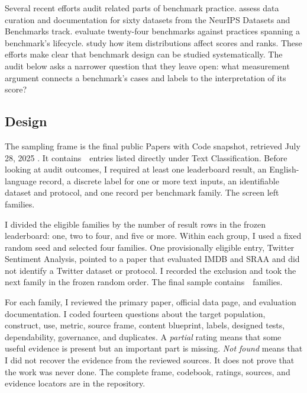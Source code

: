 \documentclass[11pt]{article}
\begin{document}
Several recent efforts audit related parts of benchmark practice. {\citet{bhardwaj2024curation}} assess data curation and documentation for sixty datasets from the NeurIPS Datasets and Benchmarks track. {\citet{reuel2024betterbench}} evaluate twenty-four benchmarks against practices spanning a benchmark's lifecycle. {\citet{kovatchev2024transparency}} study how item distributions affect scores and ranks. These efforts make clear that benchmark design can be studied systematically. The audit below asks a narrower question that they leave open: what measurement argument connects a benchmark's cases and labels to the interpretation of its score?

\subsection*{Design}

The sampling frame is the final public Papers with Code snapshot, retrieved July 28, 2025 \citep{pwcArchive2025}. It contains \,\AuditFrameCount\, entries listed directly under Text Classification. Before looking at audit outcomes, I required at least one leaderboard result, an English-language record, a discrete label for one or more text inputs, an identifiable dataset and protocol, and one record per benchmark family. The screen left \,\AuditEligibleCount\, families.

I divided the eligible families by the number of result rows in the frozen leaderboard: one, two to four, and five or more. Within each group, I used a fixed random seed and selected four families. One provisionally eligible entry, Twitter Sentiment Analysis, pointed to a paper that evaluated IMDB and SRAA and did not identify a Twitter dataset or protocol. I recorded the exclusion and took the next family in the frozen random order. The final sample contains \,\AuditSampleCount\, families.

For each family, I reviewed the primary paper, official data page, and evaluation documentation. I coded fourteen questions about the target population, construct, use, metric, source frame, content blueprint, labels, designed tests, dependability, governance, and duplicates. A {\emph{partial}} rating means that some useful evidence is present but an important part is missing. {\emph{Not found}} means that I did not recover the evidence from the reviewed sources. It does not prove that the work was never done. The complete frame, codebook, ratings, sources, and evidence locators are in the repository.
\end{document}
